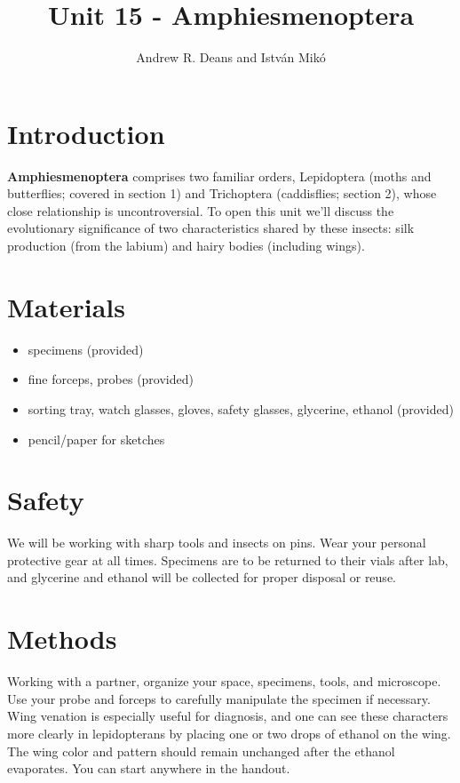\documentclass[letterpaper, 11pt]{article}
\title{Unit 15 - Amphiesmenoptera}
\author{Andrew R. Deans and Istv\'an Mik\'o}
\begin{document}
\cleanlookdateon %
\maketitle
\thispagestyle{fancy}

\section*{Introduction}
\textbf{Amphiesmenoptera} comprises two familiar orders, Lepidoptera (moths and butterflies; covered in section 1) and Trichoptera (caddisflies; section 2), whose close relationship is uncontroversial. To open this unit we'll discuss the evolutionary significance of two characteristics shared by these insects: silk production (from the labium) and hairy bodies (including wings).


\section*{Materials}
\begin{itemize}
\item specimens (provided)
\item fine forceps, probes (provided)
\item sorting tray, watch glasses, gloves, safety glasses, glycerine, ethanol (provided)
\item pencil/paper for sketches
\end{itemize}

\section*{Safety}
We will be working with sharp tools and insects on pins. Wear your personal protective gear at all times. Specimens are to be returned to their vials after lab, and glycerine and ethanol will be collected for proper disposal or reuse.

\section*{Methods}
Working with a partner, organize your space, specimens, tools, and microscope. Use your probe and forceps to carefully manipulate the specimen if necessary. Wing venation is especially useful for diagnosis, and one can see these characters more clearly in lepidopterans by placing one or two drops of ethanol on the wing. The wing color and pattern should remain unchanged after the ethanol evaporates. You can start anywhere in the handout.
\end{document}
